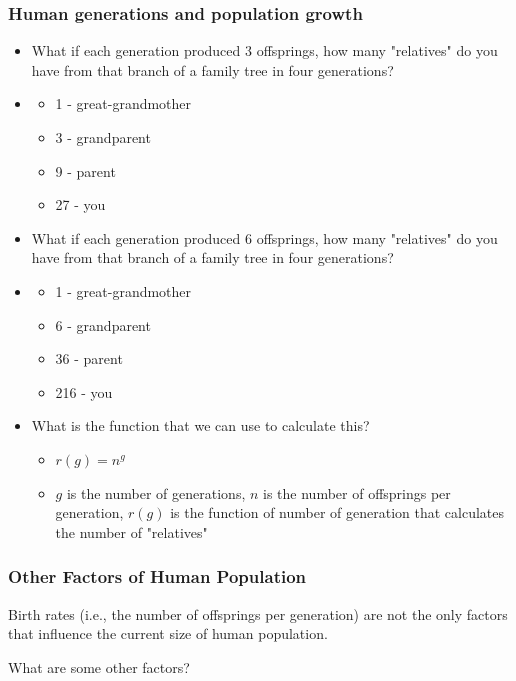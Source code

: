 \documentclass[notheorems
          ]
          {beamer}
\begin{document}
\begin{frame}
 \frametitle {  Human generations and population growth  }
 
 \begin{itemize}
  \item What if each generation produced 3 offsprings, how many "relatives" do you 
  have from that branch of a family tree in four generations? 
  \item \footnotesize{
  \begin{itemize}[<*>]
   \item 1 - great-grandmother
   \item 3 - grandparent 
   \item 9 - parent 
   \item 27 - you 
   
  \end{itemize}
  }
  \vspace{1em} 
  \item What if each generation produced 6 offsprings, how many "relatives" do you 
  have from that branch of a family tree in four generations? 
  \item \footnotesize{
  \begin{itemize}[<*>]
   \item 1 - great-grandmother
   \item 6 - grandparent 
   \item 36 - parent 
   \item 216 - you 
  \end{itemize}
  } 
  \vspace{1em}  
  \item What is the function that we can use to calculate this? 
  \begin{itemize}
   \item $r(g) = n^g$ 
   \item $g$ is the number of generations, $n$ is the number of offsprings per generation, $r(g)$ is the function of number of
   generation that calculates the number of "relatives" 
  \end{itemize}

  

 \end{itemize}

\end{frame}



\begin{frame}
 \frametitle { Other Factors of Human Population    }
 
 Birth rates (i.e., the number of offsprings per generation) are not the only factors 
 that influence the current size of human population.
 \vspace{2em}
 
 What are some other factors? 


\end{frame}
\end{document}
